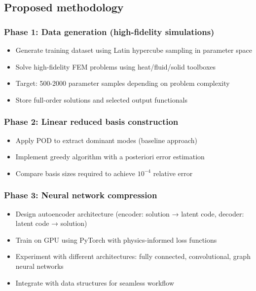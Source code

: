 \subsection{Proposed methodology}

\subsubsection{Phase 1: Data generation (high-fidelity simulations)}
\begin{itemize}
\item Generate training dataset using Latin hypercube sampling in parameter space
\item Solve high-fidelity FEM problems using \Feelpp heat/fluid/solid toolboxes
\item Target: 500-2000 parameter samples depending on problem complexity
\item Store full-order solutions and selected output functionals
\end{itemize}

\subsubsection{Phase 2: Linear reduced basis construction}
\begin{itemize}
\item Apply POD to extract dominant modes (baseline approach)
\item Implement greedy algorithm with a posteriori error estimation
\item Compare basis sizes required to achieve $10^{-4}$ relative error
\end{itemize}

\subsubsection{Phase 3: Neural network compression}
\begin{itemize}
\item Design autoencoder architecture (encoder: solution → latent code, decoder: latent code → solution)
\item Train on GPU using PyTorch with physics-informed loss functions
\item Experiment with different architectures: fully connected, convolutional, graph neural networks
\item Integrate with \Feelpp data structures for seamless workflow
\end{itemize}

